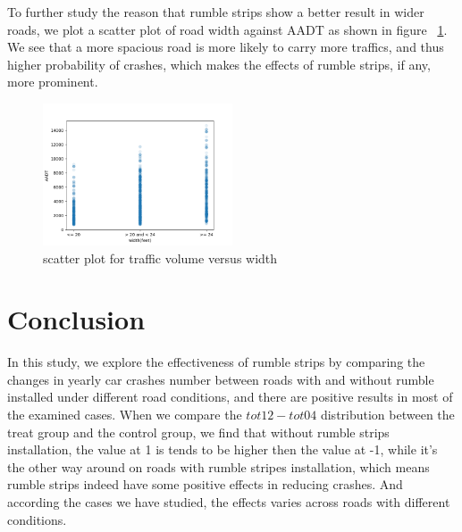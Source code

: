 \documentclass{article}
\begin{document}
To further study the reason that rumble strips show a better result in wider roads, we plot a scatter plot of road width against AADT as shown in figure ~\ref{fig:width-adt}. We see that a more spacious road is more likely to carry more traffics, and thus higher probability of crashes, which makes the effects of rumble strips, if any, more prominent.

\begin{figure}[h!]
    \centering
    \includegraphics[width=0.5\textwidth]{width-adt-scatter.png}
    \caption{scatter plot for traffic volume versus width}
    \label{fig:width-adt}
\end{figure}

\section*{Conclusion}

In this study, we explore the effectiveness of rumble strips by comparing the changes in yearly car crashes number between roads with and without rumble installed under different road conditions, and there are positive results in most of the examined cases. When we compare the $tot12-tot04$ distribution between the treat group and the control group, we find that without rumble strips installation, the value at 1 is tends to be higher then the value at -1, while it's the other way around on roads with rumble stripes installation, which means rumble strips indeed have some positive effects in reducing crashes. And according the cases we have studied, the effects varies across roads with different conditions.

 

\end{document}
